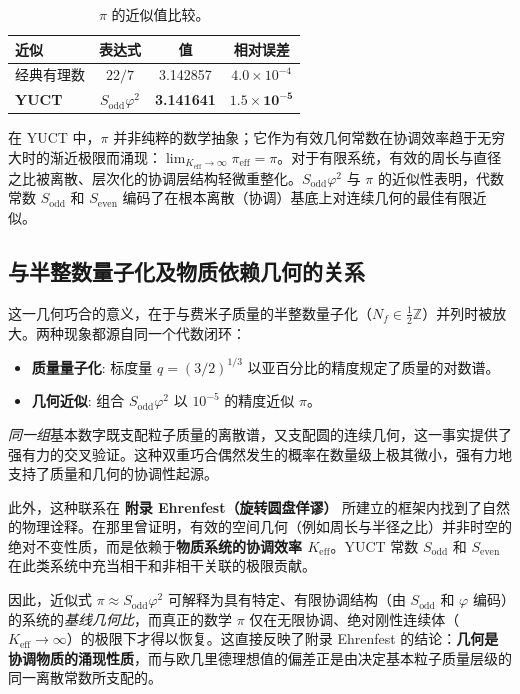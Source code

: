 \documentclass[11pt,a4paper]{article}
\theoremstyle{remark}
\begin{document}
	\begin{table}[htbp]
		\centering
		\caption{\(\pi\) 的近似值比较。}
		\label{tab:pi_approx}
		\begin{tabular}{lccc}
			\toprule
			\textbf{近似} & \textbf{表达式} & \textbf{值} & \textbf{相对误差} \\
			\midrule
			经典有理数 & \(22/7\) & 3.142857 & \(4.0 \times 10^{-4}\) \\
			\textbf{YUCT} & \(S_{\mathrm{odd}}\varphi^2\) & \textbf{3.141641} & \(\mathbf{1.5 \times 10^{-5}}\) \\
			\bottomrule
		\end{tabular}
	\end{table}
	
	在 YUCT 中，\(\pi\) 并非纯粹的数学抽象；它作为有效几何常数在协调效率趋于无穷大时的渐近极限而涌现：\(\lim_{K_{\mathrm{eff}} \to \infty} \pi_{\mathrm{eff}} = \pi\)。对于有限系统，有效的周长与直径之比被离散、层次化的协调层结构轻微重整化。\(S_{\mathrm{odd}}\varphi^2\) 与 \(\pi\) 的近似性表明，代数常数 \(S_{\mathrm{odd}}\) 和 \(S_{\mathrm{even}}\) 编码了在根本离散（协调）基底上对连续几何的最佳有限近似。
	
	\subsection{与半整数量子化及物质依赖几何的关系}
	
	这一几何巧合的意义，在于与费米子质量的半整数量子化（\(N_f \in \frac{1}{2}\mathbb{Z}\)）并列时被放大。两种现象都源自同一个代数闭环：
	\begin{itemize}
		\item \textbf{质量量子化}: 标度量 \(q = (3/2)^{1/3}\) 以亚百分比的精度规定了质量的对数谱。
		\item \textbf{几何近似}: 组合 \(S_{\mathrm{odd}}\varphi^2\) 以 \(10^{-5}\) 的精度近似 \(\pi\)。
	\end{itemize}
	\emph{同一组}基本数字既支配粒子质量的离散谱，又支配圆的连续几何，这一事实提供了强有力的交叉验证。这种双重巧合偶然发生的概率在数量级上极其微小，强有力地支持了质量和几何的协调性起源。
	
	此外，这种联系在 \textbf{附录 Ehrenfest（旋转圆盘佯谬）} 所建立的框架内找到了自然的物理诠释。在那里曾证明，有效的空间几何（例如周长与半径之比）并非时空的绝对不变性质，而是依赖于\textbf{物质系统的协调效率 \(K_{\mathrm{eff}}\)}。YUCT 常数 \(S_{\mathrm{odd}}\) 和 \(S_{\mathrm{even}}\) 在此类系统中充当相干和非相干关联的极限贡献。
	
	因此，近似式 \(\pi \approx S_{\mathrm{odd}}\varphi^2\) 可解释为具有特定、有限协调结构（由 \(S_{\mathrm{odd}}\) 和 \(\varphi\) 编码）的系统的\emph{基线几何比}，而真正的数学 \(\pi\) 仅在无限协调、绝对刚性连续体（\(K_{\mathrm{eff}} \to \infty\)）的极限下才得以恢复。这直接反映了附录 Ehrenfest 的结论：\textbf{几何是协调物质的涌现性质}，而与欧几里德理想值的偏差正是由决定基本粒子质量层级的同一离散常数所支配的。
	
\end{document}
